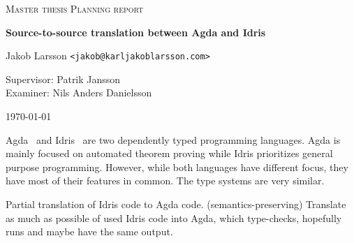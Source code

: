 \documentclass{scrartcl}
\begin{document}
\begin{titlepage}

\centering
{\scshape\LARGE Master thesis Planning report}


\vspace{0.5cm}
{\huge\bfseries Source-to-source translation between Agda and Idris
  }

\vspace{2cm}
{\Large Jakob Larsson \texttt{<jakob@karljakoblarsson.com>}}

\vspace{1.0cm}
{\large Supervisor: Patrik Jansson  \\
        Examiner: Nils Anders Danielsson}

\vspace{1.5cm}

\vfill
{\large \today}

\end{titlepage}

%
%




Agda~\cite{agda} and Idris~\cite{idris} are two dependently typed programming
languages.  Agda is mainly focused on automated theorem proving while Idris
prioritizes general purpose programming.  However, while both languages have
different focus, they have most of their features in common. The type systems
are very similar.



Partial translation of Idris code to Agda code. (semantics-preserving)
Translate as much as possible of used Idris code into Agda, which type-checks,
hopefully runs and maybe have the same output.
\end{document}
